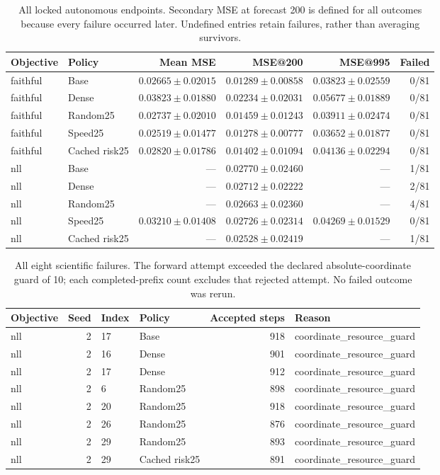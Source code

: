 \begin{table}[t]
\centering\small
\caption{All locked autonomous endpoints. Secondary MSE at forecast 200 is defined for all outcomes because every failure occurred later. Undefined entries retain failures, rather than averaging survivors.}
\label{tab:full-endpoints}
\begin{tabular}{llrrrr}
\toprule
Objective & Policy & Mean MSE & MSE@200 & MSE@995 & Failed\\
\midrule
faithful & Base & $0.02665\pm0.02015$ & $0.01289\pm0.00858$ & $0.03823\pm0.02559$ & 0/81\\
faithful & Dense & $0.03823\pm0.01880$ & $0.02234\pm0.02031$ & $0.05677\pm0.01889$ & 0/81\\
faithful & Random25 & $0.02737\pm0.02010$ & $0.01459\pm0.01243$ & $0.03911\pm0.02474$ & 0/81\\
faithful & Speed25 & $0.02519\pm0.01477$ & $0.01278\pm0.00777$ & $0.03652\pm0.01877$ & 0/81\\
faithful & Cached risk25 & $0.02820\pm0.01786$ & $0.01402\pm0.01094$ & $0.04136\pm0.02294$ & 0/81\\
nll & Base & --- & $0.02770\pm0.02460$ & --- & 1/81\\
nll & Dense & --- & $0.02712\pm0.02222$ & --- & 2/81\\
nll & Random25 & --- & $0.02663\pm0.02360$ & --- & 4/81\\
nll & Speed25 & $0.03210\pm0.01408$ & $0.02726\pm0.02314$ & $0.04269\pm0.01529$ & 0/81\\
nll & Cached risk25 & --- & $0.02528\pm0.02419$ & --- & 1/81\\
\bottomrule
\end{tabular}
\end{table}


\begin{table}[t]
\centering\small
\caption{All eight scientific failures. The forward attempt exceeded the declared absolute-coordinate guard of 10; each completed-prefix count excludes that rejected attempt. No failed outcome was rerun.}
\label{tab:full-failures}
\begin{tabular}{lrllrl}
\toprule
Objective & Seed & Index & Policy & Accepted steps & Reason\\
\midrule
nll & 2 & 17 & Base & 918 & coordinate\_resource\_guard\\
nll & 2 & 16 & Dense & 901 & coordinate\_resource\_guard\\
nll & 2 & 17 & Dense & 912 & coordinate\_resource\_guard\\
nll & 2 & 6 & Random25 & 898 & coordinate\_resource\_guard\\
nll & 2 & 20 & Random25 & 918 & coordinate\_resource\_guard\\
nll & 2 & 26 & Random25 & 876 & coordinate\_resource\_guard\\
nll & 2 & 29 & Random25 & 893 & coordinate\_resource\_guard\\
nll & 2 & 29 & Cached risk25 & 891 & coordinate\_resource\_guard\\
\bottomrule
\end{tabular}
\end{table}


